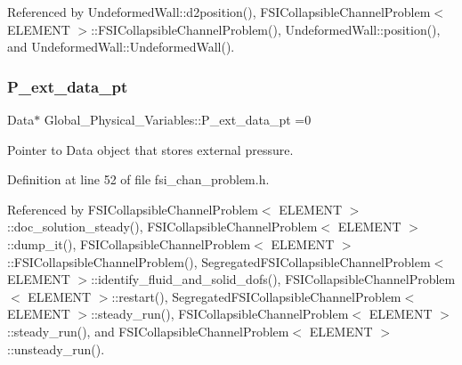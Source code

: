 Referenced by Undeformed\+Wall\+::d2position(), F\+S\+I\+Collapsible\+Channel\+Problem$<$ E\+L\+E\+M\+E\+N\+T $>$\+::\+F\+S\+I\+Collapsible\+Channel\+Problem(), Undeformed\+Wall\+::position(), and Undeformed\+Wall\+::\+Undeformed\+Wall().

\mbox{\label{namespaceGlobal__Physical__Variables_ad31ed4ea9a7fce4c20c2230d26047f6f}} 
\subsubsection{\texorpdfstring{P\+\_\+ext\+\_\+data\+\_\+pt}{P\_ext\_data\_pt}}
{\footnotesize\ttfamily Data$\ast$ Global\+\_\+\+Physical\+\_\+\+Variables\+::\+P\+\_\+ext\+\_\+data\+\_\+pt =0}



Pointer to Data object that stores external pressure. 



Definition at line 52 of file fsi\+\_\+chan\+\_\+problem.\+h.



Referenced by F\+S\+I\+Collapsible\+Channel\+Problem$<$ E\+L\+E\+M\+E\+N\+T $>$\+::doc\+\_\+solution\+\_\+steady(), F\+S\+I\+Collapsible\+Channel\+Problem$<$ E\+L\+E\+M\+E\+N\+T $>$\+::dump\+\_\+it(), F\+S\+I\+Collapsible\+Channel\+Problem$<$ E\+L\+E\+M\+E\+N\+T $>$\+::\+F\+S\+I\+Collapsible\+Channel\+Problem(), Segregated\+F\+S\+I\+Collapsible\+Channel\+Problem$<$ E\+L\+E\+M\+E\+N\+T $>$\+::identify\+\_\+fluid\+\_\+and\+\_\+solid\+\_\+dofs(), F\+S\+I\+Collapsible\+Channel\+Problem$<$ E\+L\+E\+M\+E\+N\+T $>$\+::restart(), Segregated\+F\+S\+I\+Collapsible\+Channel\+Problem$<$ E\+L\+E\+M\+E\+N\+T $>$\+::steady\+\_\+run(), F\+S\+I\+Collapsible\+Channel\+Problem$<$ E\+L\+E\+M\+E\+N\+T $>$\+::steady\+\_\+run(), and F\+S\+I\+Collapsible\+Channel\+Problem$<$ E\+L\+E\+M\+E\+N\+T $>$\+::unsteady\+\_\+run().

\mbox{\label{namespaceGlobal__Physical__Variables_aa1a76edebe4c23344938421cd68f0a8b}} 
